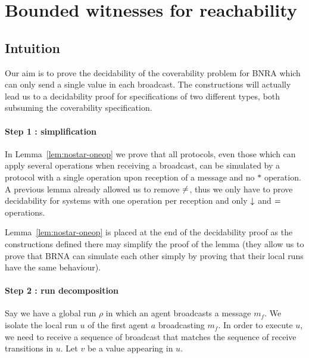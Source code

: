 \section{Bounded witnesses for reachability}

\ifintuition
\subsection{Intuition}

Our aim is to prove the decidability of the coverability problem for BNRA which can only send a single value in each broadcast. The constructions will actually lead us to a decidability proof for specifications of two different types, both subsuming the coverability specification.

\paragraph*{Step 1 : simplification} In Lemma~\ref{lem:nostar-oneop} we prove that all protocols, even those which can apply several operations when receiving a broadcast, can be simulated by a protocol with a single operation upon reception of a message and no $*$ operation. A previous lemma already allowed us to remove ${\ne}$, thus we only have to prove decidability for systems with one operation per reception and only $\downarrow$ and ${=}$ operations.

Lemma~\ref{lem:nostar-oneop} is placed at the end of the decidability proof as the constructions defined there may simplify the proof of the lemma (they allow us to prove that BRNA can simulate each other simply by proving that their local runs have the same behaviour).

\paragraph*{Step 2 : run decomposition} Say we have a global run $\rho$ in which an agent broadcasts a message $m_f$. We isolate the local run $u$ of the first agent $a$ broadcasting $m_f$.
In order to execute $u$, we need to receive a sequence of broadcast that matches the sequence of receive transitions in $u$. Let $v$ be a value appearing in $u$.

